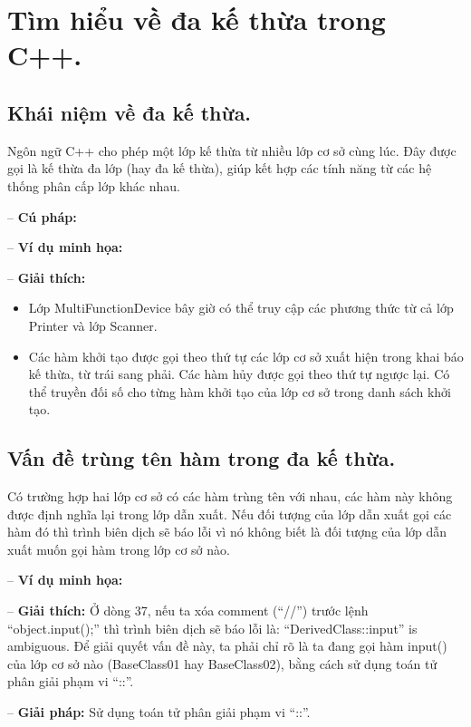 \section{Tìm hiểu về đa kế thừa trong C++.}

\subsection{Khái niệm về đa kế thừa.}
Ngôn ngữ C++ cho phép một lớp kế thừa từ nhiều lớp cơ sở cùng lúc.
Đây được gọi là kế thừa đa lớp (hay đa kế thừa), giúp kết hợp các tính năng từ các hệ thống phân cấp lớp khác nhau.

-- \textbf{Cú pháp:}


-- \textbf{Ví dụ minh họa:}


-- \textbf{Giải thích:}
\begin{itemize}
    \item[$+$] Lớp MultiFunctionDevice bây giờ có thể truy cập các phương thức từ cả lớp Printer và lớp Scanner.
    \item[$+$] Các hàm khởi tạo được gọi theo thứ tự các lớp cơ sở xuất hiện trong khai báo kế thừa,
               từ trái sang phải. Các hàm hủy được gọi theo thứ tự ngược lại.
               Có thể truyền đối số cho từng hàm khởi tạo của lớp cơ sở trong danh sách khởi tạo.
\end{itemize}

\subsection{Vấn đề trùng tên hàm trong đa kế thừa.}
Có trường hợp hai lớp cơ sở có các hàm trùng tên với nhau, các hàm này không được định nghĩa lại trong lớp dẫn xuất.
Nếu đối tượng của lớp dẫn xuất gọi các hàm đó thì trình biên dịch sẽ báo lỗi vì nó không biết là đối tượng của lớp dẫn xuất
muốn gọi hàm trong lớp cơ sở nào.

-- \textbf{Ví dụ minh họa:}


-- \textbf{Giải thích:} Ở dòng 37, nếu ta xóa comment (“//”) trước lệnh “object.input();” thì trình biên dịch 
sẽ báo lỗi là: “DerivedClass::input” is ambiguous. Để giải quyết vấn đề này, ta phải chỉ rõ là ta đang gọi hàm input() 
của lớp cơ sở nào (BaseClass01 hay BaseClass02), bằng cách sử dụng toán tử phân giải phạm vi “::”.

-- \textbf{Giải pháp:} Sử dụng toán tử phân giải phạm vi “::”.



